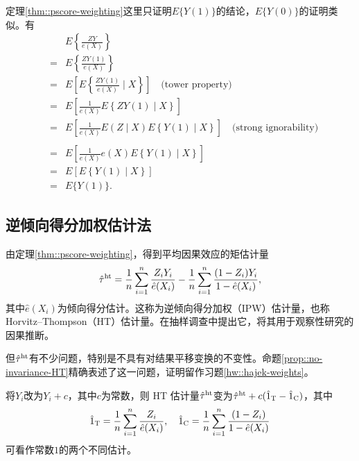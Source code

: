 \begin{myproof}{定理}{\ref{thm::pscore-weighting}}这里只证明$E\{ Y(1) \}$的结论，$E\{ Y(0) \}$的证明类似。有
\begin{eqnarray*}
&&E\left\{  \frac{ZY}{e(X)}  \right\} \\
&=& E\left\{  \frac{ZY(1)}{e(X)}  \right\} \\
&=& E\left[ E\left\{  \frac{ZY(1)}{e(X)}  \mid X \right\}  \right]  \quad \text{(tower property)} \\
&=& E\left[  \frac{1}{e(X)}   E\left\{   ZY(1)  \mid X \right\}  \right]   \\
&=& E\left[  \frac{1}{e(X)}   E( Z  \mid X ) E\left\{   Y(1)  \mid X \right\}  \right]  \quad \text{(strong ignorability)} \\\\
&=& E\left[  \frac{1}{e(X)}   e(X) E\left\{   Y(1)  \mid X \right\}  \right] \\
&=& E\left[ E\left\{   Y(1)  \mid X \right\}  \right] \\
&=& E\{   Y(1) \}. 
\end{eqnarray*}
\end{myproof}



\subsection{逆倾向得分加权估计法}\label{sec::ipw-estimators}

由定理\ref{thm::pscore-weighting}，得到平均因果效应的矩估计量
$$
\hat{\tau}^\textup{ht} = \frac{1}{n} \sum_{i=1}^n \frac{Z_i Y_i}{ \hat{e}(X_i) }
- \frac{1}{n} \sum_{i=1}^n \frac{ (1-Z_i) Y_i}{ 1 - \hat{e}(X_i) } ,
$$
其中$\hat{e}(X_i)$为倾向得分估计。这称为逆倾向得分加权（IPW）估计量，也称 Horvitz--Thompson（HT）估计量。\citet{horvitz1952generalization}在抽样调查中提出它，\citet{rosenbaum1987model}将其用于观察性研究的因果推断。 


但$\hat{\tau}^\textup{ht}$有不少问题，特别是不具有对结果平移变换的不变性。命题\ref{prop::no-invariance-HT}精确表述了这一问题，证明留作习题\ref{hw::hajek-weights}。 

\begin{proposition}
[HT估计法的非不变性]
\label{prop::no-invariance-HT}
将$Y_i$改为$Y_i+c$，其中$c$为常数，则 HT 估计量$\hat{\tau}^\textup{ht}$变为$\hat{\tau}^\textup{ht} + c (\hat{ 1 }_\textsc{T} - \hat{ 1 }_\textsc{C})$，其中
$$
\hat{ 1 }_\textsc{T}=   \frac{1}{n} \sum_{i=1}^n \frac{Z_i }{ \hat{e}(X_i) } ,\quad
\hat{ 1 }_\textsc{C} =\frac{1}{n} \sum_{i=1}^n \frac{ (1-Z_i) }{ 1 - \hat{e}(X_i) }   
$$
可看作常数$1$的两个不同估计。 
\end{proposition}

